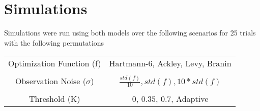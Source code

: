 \section{Simulations}
Simulations were run using both models over the following scenarios for 25 trials with the following permutations
\begin{table}[h]
\centering
\begin{tabular}{ c  c }
  Optimization Function (f) & Hartmann-6, Ackley, Levy, Branin\\\\
  Observation Noise ($\sigma$) & $\frac{std(f)}{10}, std(f), 10*std(f)$\\\\
  Threshold (K) & $0$, $0.35$, $0.7$, Adaptive
\end{tabular}
\end{table}

